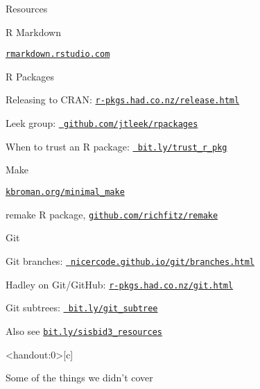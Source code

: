 \documentclass[12pt,t]{beamer}
\begin{document}
\begin{frame}[c]{Resources}

  \bi
\item R Markdown
  \bi
    \item \href{https://rmarkdown.rstudio.com}{\tt rmarkdown.rstudio.com}
  \ei
\item R Packages
  \bi
    \item Releasing to CRAN:
      \href{http://r-pkgs.had.co.nz/release.html}{\tt \footnotesize r-pkgs.had.co.nz/release.html}
    \item Leek group: \href{https://github.com/jtleek/rpackages}{\tt
      \footnotesize github.com/jtleek/rpackages}
    \item When to trust an R package:
      \href{https://simplystatistics.org/2015/11/06/how-i-decide-when-to-trust-an-r-package/}{\tt
        \footnotesize bit.ly/trust\_r\_pkg}
  \ei
\item Make
  \bi
    \item \href{http://kbroman.org/minimal_make}{\tt kbroman.org/minimal\_make}
    \item remake R package,
      \href{https://github.com/richfitz/remake}{\tt github.com/richfitz/remake}
  \ei
\item Git
  \bi
    \item Git branches:
      \href{https://nicercode.github.io/git/branches.html}{\tt
        \footnotesize nicercode.github.io/git/branches.html}
    \item Hadley on Git/GitHub:
      \href{http://r-pkgs.had.co.nz/git.html}{\tt \footnotesize r-pkgs.had.co.nz/git.html}
    \item Git subtrees:
      \href{https://developer.atlassian.com/blog/2015/05/the-power-of-git-subtree/}{\tt
        \footnotesize bit.ly/git\_subtree}
  \ei
  \item Also see \href{https://bit.ly/sisbid3_resources}{\tt bit.ly/sisbid3\_resources}
  \ei



\end{frame}


\begin{frame}<handout:0>[c]{}

  \begin{center}
    \large
    Some of the things we didn't cover
  \end{center}
\end{frame}
\end{document}
